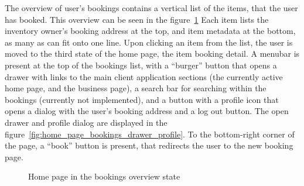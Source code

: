 The overview of user's bookings contains a vertical list of the items, that the user has booked. This overview can be seen in the figure~\ref{fig:home_page_bookings} Each item lists the inventory owner's booking address at the top, and item metadata at the bottom, as many as can fit onto one line. Upon clicking an item from the list, the user is moved to the third state of the home page, the item booking detail. A menubar is present at the top of the bookings list, with a \enquote{burger} button that opens a drawer with links to the main client application sections (the currently active home page, and the business page), a search bar for searching within the bookings (currently not implemented), and a button with a profile icon that opens a dialog with the user's booking address and a log out button. The open drawer and profile dialog are displayed in the figure~\ref{fig:home_page_bookings_drawer_profile}. To the bottom-right corner of the page, a \enquote{book} button is present, that redirects the user to the new booking page.

\begin{figure}
    \centering
    \caption[Home page -- Bookings overview]{Home page in the bookings overview state}
    \label{fig:home_page_bookings}
\end{figure}

